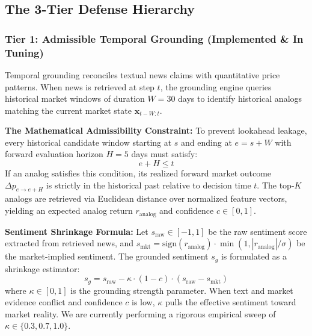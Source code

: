 \documentclass[11pt,a4paper]{article}
\begin{document}
\subsection{The 3-Tier Defense Hierarchy}

\subsubsection{Tier 1: Admissible Temporal Grounding (Implemented \& In Tuning)}
Temporal grounding reconciles textual news claims with quantitative price patterns. When news is retrieved at step $t$, the grounding engine queries historical market windows of duration $W=30$ days to identify historical analogs matching the current market state $\mathbf{x}_{t-W:t}$.

\textbf{The Mathematical Admissibility Constraint:} To prevent lookahead leakage, every historical candidate window starting at $s$ and ending at $e = s + W$ with forward evaluation horizon $H = 5$ days must satisfy:
\begin{equation}
    e + H \le t
\end{equation}
If an analog satisfies this condition, its realized forward market outcome $\Delta p_{e \to e+H}$ is strictly in the historical past relative to decision time $t$. The top-$K$ analogs are retrieved via Euclidean distance over normalized feature vectors, yielding an expected analog return $r_{\text{analog}}$ and confidence $c \in [0, 1]$.

\textbf{Sentiment Shrinkage Formula:} Let $s_{\text{raw}} \in [-1, 1]$ be the raw sentiment score extracted from retrieved news, and $s_{\text{mkt}} = \text{sign}(r_{\text{analog}}) \cdot \min(1, |r_{\text{analog}}|/\sigma)$ be the market-implied sentiment. The grounded sentiment $s_g$ is formulated as a shrinkage estimator:
\begin{equation}
    s_g = s_{\text{raw}} - \kappa \cdot (1 - c) \cdot \left( s_{\text{raw}} - s_{\text{mkt}} \right)
\end{equation}
where $\kappa \in [0, 1]$ is the grounding strength parameter. When text and market evidence conflict and confidence $c$ is low, $\kappa$ pulls the effective sentiment toward market reality. We are currently performing a rigorous empirical sweep of $\kappa \in \{0.3, 0.7, 1.0\}$.
\end{document}
